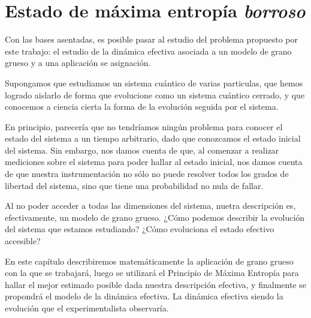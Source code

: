 \chapter{Estado de máxima entropía \textit{borroso}}

Con las bases asentadas, es posible pasar al estudio del problema propuesto por este trabajo: el estudio de la dinámica efectiva asociada a un modelo de grano grueso y a una aplicación se asignación.

Supongamos que estudiamos un sistema cuántico de varias particulas, que hemos logrado aislarlo de forma que evolucione como un sistema cuántico cerrado, y que conocemos a ciencia cierta la forma de la evolución seguida por el sistema.

En principio, parecería que no tendríamos ningún problema para conocer el estado del sistema a un tiempo arbitrario, dado que conozcamos el estado inicial del sistema. Sin embargo, nos damos cuenta de que, al comenzar a realizar mediciones sobre el sistema para poder hallar al estado inicial, nos damos cuenta de que nuestra instrumentación no sólo no puede resolver todos los grados de libertad del sistema, sino que tiene una probabilidad no nula de fallar.

Al no poder acceder a todas las dimensiones del sistema, nuetra descripción es, efectivamente, un modelo de grano grueso. ¿Cómo podemos describir la evolución del sistema que estamos estudiando? ¿Cómo evoluciona el estado efectivo accesible?

En este capítulo describiremos matemáticamente la aplicación de grano grueso con la que se trabajará, luego se utilizará el Principio de Máxima Entropía para hallar el mejor estimado posible dada nuestra descripción efectiva, y finalmente se propondrá el modelo de la dinámica efectiva. La dinámica efectiva siendo la evolución que el experimentalista observaría.






\newpage
